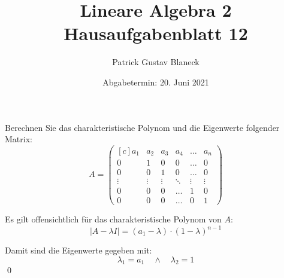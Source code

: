 \documentclass[answers]{exam}
\title{Lineare Algebra 2 \\ \large{Hausaufgabenblatt 12}}
\author{Patrick Gustav Blaneck}
\date{Abgabetermin: 20. Juni 2021}
\newcommand{\abs}[1]{\left| #1 \right|}
\newcommand{\vektor}[1]{\begin{pmatrix*}[c] #1 \end{pmatrix*}}
\begin{document}
\maketitle
\begin{questions}
    \setcounter{question}{4}
    \question
    Berechnen Sie das charakteristische Polynom und die Eigenwerte folgender Matrix:
    $$
        A =
        \vektor{
            a_1 & a_2 & a_3 & a_4 & \ldots & a_n \\
            0 & 1 & 0 & 0 & \ldots & 0 \\
            0 & 0 & 1 & 0 & \ldots & 0 \\
            \vdots & \vdots & \vdots & \ddots & \vdots & \vdots \\
            0 & 0 & 0 & \ldots & 1 & 0 \\
            0 & 0 & 0 & \ldots & 0 & 1
        }
    $$
    \begin{solution}
        Es gilt offensichtlich für das charakteristische Polynom von $A$:
        $$
            \abs{A - \lambda I} = \left( a_1 - \lambda \right) \cdot (1 - \lambda)^{n-1}
        $$

        Damit sind die Eigenwerte gegeben mit:
        $$
            \lambda_1 = a_1 \quad \land \quad \lambda_2 = 1
        $$\qed
    \end{solution}


\end{questions}
\end{document}

